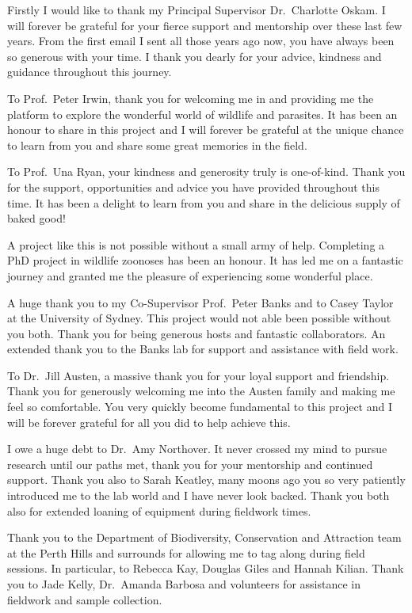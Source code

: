 \documentclass[a4paper, nobind]{templates/ociamthesis}
\begin{document}
\begin{romanpages}


\begin{acknowledgements}
 	Firstly I would like to thank my Principal Supervisor Dr.~Charlotte Oskam.
  I will forever be grateful for your fierce support and mentorship over these last few years.
  From the first email I sent all those years ago now, you have always been so generous with your time.
  I thank you dearly for your advice, kindness and guidance throughout this journey.

  To Prof.~Peter Irwin, thank you for welcoming me in and providing me the platform to explore the wonderful world of wildlife and parasites.
  It has been an honour to share in this project and I will forever be grateful at the unique chance to learn from you and share some great memories in the field.

  To Prof.~Una Ryan, your kindness and generosity truly is one-of-kind.
  Thank you for the support, opportunities and advice you have provided throughout this time.
  It has been a delight to learn from you and share in the delicious supply of baked good!

  A project like this is not possible without a small army of help. Completing a PhD project in wildlife zoonoses has been an honour.
  It has led me on a fantastic journey and granted me the pleasure of experiencing some wonderful place.

  A huge thank you to my Co-Supervisor Prof.~Peter Banks and to Casey Taylor at the University of Sydney. This project would not able been possible without you both.
  Thank you for being generous hosts and fantastic collaborators.
  An extended thank you to the Banks lab for support and assistance with field work.

  To Dr.~Jill Austen, a massive thank you for your loyal support and friendship.
  Thank you for generously welcoming me into the Austen family and making me feel so comfortable. You very quickly become fundamental to this project and I will be forever grateful for all you did to help achieve this.

  I owe a huge debt to Dr.~Amy Northover. It never crossed my mind to pursue research until our paths met, thank you for your mentorship and continued support. Thank you also to Sarah Keatley, many moons ago you so very patiently introduced me to the lab world and I have never look backed. Thank you both also for extended loaning of equipment during fieldwork times.

  Thank you to the Department of Biodiversity, Conservation and Attraction team at the Perth Hills and surrounds for allowing me to tag along during field sessions. In particular, to Rebecca Kay, Douglas Giles and Hannah Kilian. Thank you to Jade Kelly, Dr.~Amanda Barbosa and volunteers for assistance in fieldwork and sample collection.


\end{acknowledgements}
\end{romanpages}
\end{document}
